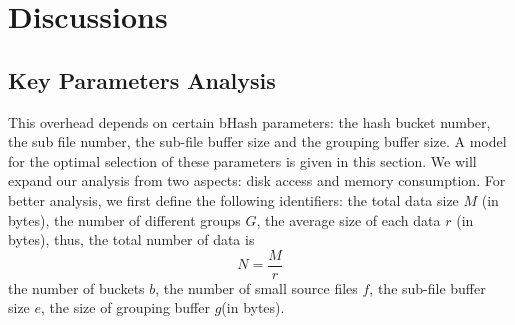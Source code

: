 \section{Discussions}
\label{sec:param}

\subsection{Key Parameters Analysis}

This overhead depends on certain bHash parameters: the hash bucket number, the sub file number, the sub-file buffer size and the grouping buffer size. A model for the optimal selection of these parameters is given in this section. We will expand our analysis from two aspects: disk access and memory consumption. For better analysis, we first define the following identifiers: the total data size $M$ (in bytes), the number of different groups $G$, the average size of each data $r$ (in bytes), thus, the total number of data is
\begin{equation}\label{eq:numberofdata}
  N=\frac{M}{r}
\end{equation}
the number of buckets $b$, the number of small source files $f$, the sub-file buffer size $e$, the size of grouping buffer $g$(in bytes).

